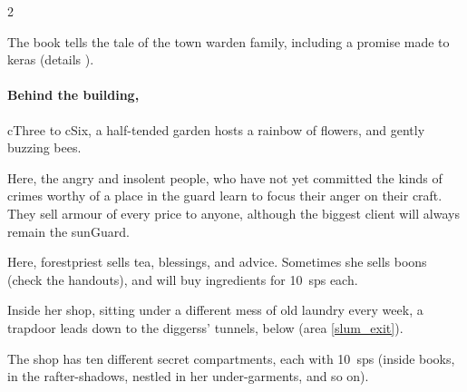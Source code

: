 \begin{multicols}{2}
\begin{enumerate}
  The book tells the tale of the \gls{town} \gls{warden} family, including a promise made to \gls{keras} (details ).
\end{enumerate}

\paragraph{Behind the building,}
\gls{cThree} to \gls{cSix}, a half-tended garden hosts a rainbow of flowers, and gently buzzing bees.



Here, the angry and insolent people, who have not yet committed the kinds of crimes worthy of a place in the \gls{guard} learn to focus their anger on their craft.
They sell armour of every price to anyone, although the biggest client will always remain the \gls{sunGuard}.


Here, \gls{forestpriest} sells tea, blessings, and advice.
Sometimes she sells \glspl{boon} (check the handouts), and will buy \glspl{ingredient} for 10~\glspl{sp} each.

Inside her shop, sitting under a different mess of old laundry every week, a trapdoor leads down to the \glspl{diggers}' tunnels, below (area \vref{slum_exit}).

The shop has ten different secret compartments, each with 10~\glspl{sp} (inside books, in the rafter-shadows, nestled in her under-garments, and so on).


%


\end{multicols}

